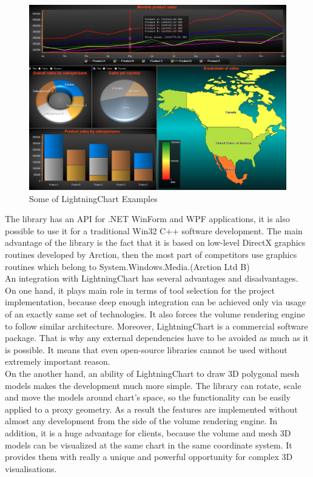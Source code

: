 \documentclass[twoside, english, 11pt]{report}
\begin{document}
\begin{figure}[!h]
\centerline{\includegraphics[scale=0.4]{img/chart}}
\caption{Some of LightningChart Examples}
\end{figure}

The library has an API for .NET WinForm and WPF applications, it is also possible to use it for a traditional Win32 C++ software development. The main advantage of the library is the fact that it is based on low-level DirectX graphics routines developed by Arction, then the most part of competitors use graphics routines which belong to System.Windows.Media.(Arction Ltd B)\\

An integration with LightningChart has several advantages and disadvantages. On one hand, it plays main role in terms of tool selection for the project implementation, because deep enough integration can be achieved only via usage of an exactly same set of technologies. It also forces the volume rendering engine to follow similar architecture. Moreover, LightningChart is a commercial software package. That is why any external dependencies have to be avoided as much as it is possible. It means that even open-source libraries cannot be used without extremely important reason.\\

On the another hand, an ability of LightningChart to draw 3D polygonal mesh models makes the development much more simple. The library can rotate, scale and move the models around chart's space, so the functionality can be easily applied to a proxy geometry. As a result the features are implemented without almost any development from the side of the volume rendering engine. In addition, it is a huge advantage for clients, because the volume and mesh 3D models can be visualized at the same chart in the same coordinate system. It provides them with really a unique and powerful opportunity for complex 3D visualisations.
\end{document}
